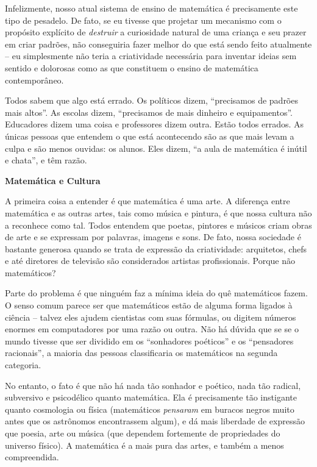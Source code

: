 \documentclass[a4paper,oneside,12pt,notitlepage]{article}
\begin{document}
\vspace{1em}

Infelizmente, nosso atual sistema de ensino de matemática é precisamente este tipo de pesadelo.
De fato, se eu tivesse que projetar um mecanismo com o propósito explícito de \textsl{destruir} a curiosidade natural de uma criança e seu prazer em criar padrões, não conseguiria fazer melhor do que está sendo feito atualmente -- eu simplesmente não teria a criatividade necessária para inventar ideias sem sentido e dolorosas como as que constituem o ensino de matemática contemporâneo.

Todos sabem que algo está errado.
Os políticos dizem, ``precisamos de padrões mais altos''.
As escolas dizem, ``precisamos de mais dinheiro e equipamentos''.
Educadores dizem uma coisa e professores dizem outra.
Estão todos errados.
As únicas pessoas que entendem o que está acontecendo são as que mais levam a culpa e são menos ouvidas: os alunos.
Eles dizem, ``a aula de matemática é inútil e chata'', e têm razão. %

\textbf{Matemática e Cultura}

A primeira coisa a entender é que matemática é uma arte.
A diferença entre matemática e as outras artes, tais como música e pintura, é que nossa cultura não a reconhece como tal.
Todos entendem que poetas, pintores e músicos criam obras de arte e se expressam por palavras, imagens e sons.
De fato, nossa sociedade é bastante generosa quando se trata de expressão da criatividade: arquitetos, chefs e até diretores de televisão são considerados artistas profissionais. %
Porque não matemáticos?

Parte do problema é que ninguém faz a mínima ideia do quê matemáticos fazem.
O senso comum parece ser que matemáticos estão de alguma forma ligados à ciência -- talvez eles ajudem cientistas com suas fórmulas, ou digitem números enormes em computadores por uma razão ou outra.
Não há dúvida que se se o mundo tivesse que ser dividido em os ``sonhadores poéticos'' e os ``pensadores racionais'', a maioria das pessoas classificaria os matemáticos na segunda categoria.

No entanto, o fato é que não há nada tão sonhador e poético, nada tão radical, subversivo e psicodélico quanto matemática.
Ela é precisamente tão instigante quanto cosmologia ou física (matemáticos \textsl{pensaram} em buracos negros muito antes que os astrônomos encontrassem algum), e dá mais liberdade de expressão que poesia, arte ou música (que dependem fortemente de propriedades do universo físico).
A matemática é a mais pura das artes, e também a menos compreendida.
\end{document}
